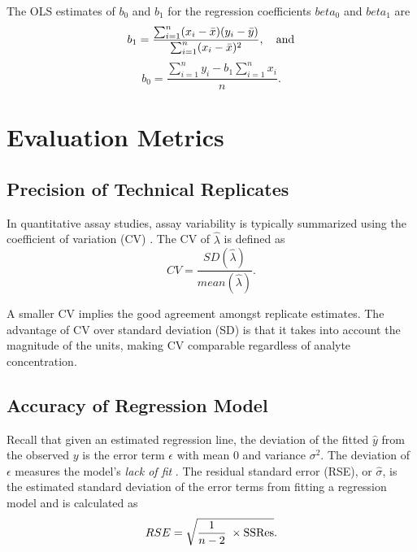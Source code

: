 The OLS estimates of \(b_0\) and \(b_1\) for the regression coefficients \(beta_0\) and \(beta_1\) are 
\[
    b_1 = \frac{\sum_{i=1}^{n}(x_i-\bar{x})(y_i - \bar{y})}{\sum_{i=1}^{n}(x_i-\bar{x})^2}, \quad \textup{and}
\]
\[
    b_0 = \frac{\sum_{i=1}^{n}y_i-b_1\sum_{i=1}^{n}x_i}{n}.
\]



\section{Evaluation Metrics}
\label{sec:evalmetric_ch3}

\subsection{Precision of Technical Replicates}
\label{sec:evalmetric_ch3_cv}

In quantitative assay studies, assay variability is typically summarized using the coefficient of variation (CV) \cite{Reed2003}. The CV of \(\hat{\lambda}\) is defined as
\[
    CV = \frac{SD(\hat{\lambda})}{mean(\hat{\lambda})}.
\]

A smaller CV implies the good agreement amongst replicate estimates. The advantage of CV over standard deviation (SD) is that it takes into account the magnitude of the units, making CV comparable regardless of analyte concentration.

\subsection{Accuracy of Regression Model}
\label{sec:evalmetric_ch3_R2ResSE}

Recall that given an estimated regression line, the deviation of the fitted \(\hat{y}\) from the observed \(y\) is the error term \(\epsilon\) with mean 0 and variance \(\sigma^2\). The deviation of \(\epsilon\) measures the model's \emph{lack of fit} \cite{ISLR}. The residual standard error (RSE), or \(\hat{\sigma}\), is the estimated standard deviation of the error terms from fitting a regression model and is calculated as 
\[
    RSE = \sqrt{\frac{1}{n-2}\; \times \textup{SSRes}}.
\]


